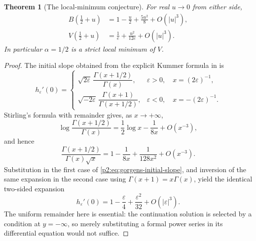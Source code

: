 \documentclass[11pt,a4paper]{article}
\newtheorem{theorem}{Theorem}[section]
\theoremstyle{definition}
\theoremstyle{remark}
\numberwithin{equation}{section}
\begin{document}
\begin{theorem}[The local-minimum conjecture]\label{p2:thm:gorgens-minimum}
For real $u\to0$ from either side,
\begin{align}
 B(\tfrac12+u)&=1-\frac u2+\frac{5u^2}{8}+O(|u|^3),
       \label{p2:eq:gorgens-boundary-expansion}\\
 V(\tfrac12+u)&=\frac1e+\frac{u^2}{12e}+O(|u|^3).
       \label{p2:eq:gorgens-value-expansion}
\end{align}
In particular $\alpha=1/2$ is a strict local minimum of $V$.
\end{theorem}
\begin{proof}
The initial slope obtained from the explicit Kummer formula in
\cite[Theorem~1]{p2:Gorgens2014} is
\begin{equation}\label{p2:eq:gorgens-initial-slope}
 h_\varepsilon'(0)=
 \begin{cases}
  \sqrt{2\varepsilon}\,
    \dfrac{\Gamma(x+1/2)}{\Gamma(x)},
       &\varepsilon>0,\quad x=(2\varepsilon)^{-1},\\[6pt]
  \sqrt{-2\varepsilon}\,
    \dfrac{\Gamma(x+1)}{\Gamma(x+1/2)},
       &\varepsilon<0,\quad x=-(2\varepsilon)^{-1}.
 \end{cases}
\end{equation}
Stirling's formula with remainder gives, as $x\to+\infty$,
\[
 \log\frac{\Gamma(x+1/2)}{\Gamma(x)}
   =\frac12\log x-\frac1{8x}+O(x^{-3}),
\]
and hence
\[
 \frac{\Gamma(x+1/2)}{\Gamma(x)\sqrt{x}}
   =1-\frac1{8x}+\frac1{128x^2}+O(x^{-3}).
\]
Substitution in the first case of
\eqref{p2:eq:gorgens-initial-slope}, and inversion of the same expansion
in the second case using $\Gamma(x+1)=x\Gamma(x)$, yield the identical
two-sided expansion
\begin{equation}\label{p2:eq:gorgens-slope-expansion}
 h_\varepsilon'(0)=1-\frac\varepsilon4
                       +\frac{\varepsilon^2}{32}
                       +O(|\varepsilon|^3).
\end{equation}
The uniform remainder here is essential: the continuation solution is
selected by a condition at $y=-\infty$, so merely substituting a formal
power series in its differential equation would not suffice.


\end{proof}
\end{document}
